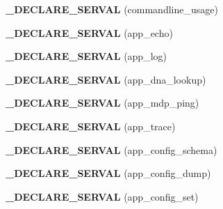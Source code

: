 \begin{DoxyCompactItemize}
\item 
\hypertarget{serval-client_8c_a9040e30dd1c35c49c74ed65afd7e1258}{{\bfseries \+\_\+\+D\+E\+C\+L\+A\+R\+E\+\_\+\+S\+E\+R\+V\+A\+L} (commandline\+\_\+usage)}\label{serval-client_8c_a9040e30dd1c35c49c74ed65afd7e1258}

\item 
\hypertarget{serval-client_8c_a34be79686df2478845168fe7ed97899d}{{\bfseries \+\_\+\+D\+E\+C\+L\+A\+R\+E\+\_\+\+S\+E\+R\+V\+A\+L} (app\+\_\+echo)}\label{serval-client_8c_a34be79686df2478845168fe7ed97899d}

\item 
\hypertarget{serval-client_8c_a2f6378cb8fc2e482bf773279d2d504c7}{{\bfseries \+\_\+\+D\+E\+C\+L\+A\+R\+E\+\_\+\+S\+E\+R\+V\+A\+L} (app\+\_\+log)}\label{serval-client_8c_a2f6378cb8fc2e482bf773279d2d504c7}

\item 
\hypertarget{serval-client_8c_ac6981d742dfc0c0db6d721a4a637af07}{{\bfseries \+\_\+\+D\+E\+C\+L\+A\+R\+E\+\_\+\+S\+E\+R\+V\+A\+L} (app\+\_\+dna\+\_\+lookup)}\label{serval-client_8c_ac6981d742dfc0c0db6d721a4a637af07}

\item 
\hypertarget{serval-client_8c_a3e70fab69572efef33d4b4d3fc40ced7}{{\bfseries \+\_\+\+D\+E\+C\+L\+A\+R\+E\+\_\+\+S\+E\+R\+V\+A\+L} (app\+\_\+mdp\+\_\+ping)}\label{serval-client_8c_a3e70fab69572efef33d4b4d3fc40ced7}

\item 
\hypertarget{serval-client_8c_a12a9edfc9e42fe68ec5cb1dd23fe0471}{{\bfseries \+\_\+\+D\+E\+C\+L\+A\+R\+E\+\_\+\+S\+E\+R\+V\+A\+L} (app\+\_\+trace)}\label{serval-client_8c_a12a9edfc9e42fe68ec5cb1dd23fe0471}

\item 
\hypertarget{serval-client_8c_a3ebbc11c0cab167980c308abf6795508}{{\bfseries \+\_\+\+D\+E\+C\+L\+A\+R\+E\+\_\+\+S\+E\+R\+V\+A\+L} (app\+\_\+config\+\_\+schema)}\label{serval-client_8c_a3ebbc11c0cab167980c308abf6795508}

\item 
\hypertarget{serval-client_8c_a0518b444ccb2917eec756f4865e8061b}{{\bfseries \+\_\+\+D\+E\+C\+L\+A\+R\+E\+\_\+\+S\+E\+R\+V\+A\+L} (app\+\_\+config\+\_\+dump)}\label{serval-client_8c_a0518b444ccb2917eec756f4865e8061b}

\item 
\hypertarget{serval-client_8c_a940723c3f05e4bbdf8b44dd7092003bf}{{\bfseries \+\_\+\+D\+E\+C\+L\+A\+R\+E\+\_\+\+S\+E\+R\+V\+A\+L} (app\+\_\+config\+\_\+set)}\label{serval-client_8c_a940723c3f05e4bbdf8b44dd7092003bf}


\end{DoxyCompactItemize}
